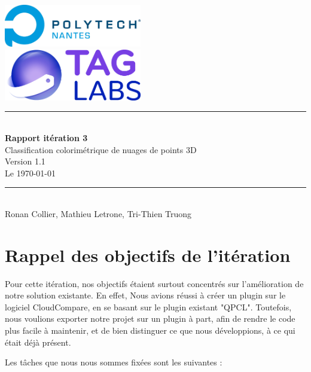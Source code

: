 \documentclass[12pt,titlepage,french]{article}
\begin{document}

\begin{titlepage}
\newcommand{\HRule}{\rule{\linewidth}{0.5mm}}
\center

  \includegraphics[width=0.45\textwidth]{../../ressources/img_logos/logo_polytech.png}\\[1cm]

  \includegraphics[width=0.45\textwidth]{../../ressources/img_logos/logo_taglabs.png}


\HRule \\[0.4cm]
{ \huge \bfseries Rapport itération 3\\[0.15cm] }
Classification colorimétrique de nuages de points 3D\\
Version 1.1\\
Le \today \\
\HRule \\[1.5cm]
Ronan Collier,
Mathieu Letrone,
Tri-Thien Truong
\\[1cm]
\end{titlepage}

\tableofcontents %
\newpage
\listoffigures  %
\newpage

\section{Rappel des objectifs de l'itération}
Pour cette itération, nos objectifs étaient surtout concentrés sur l'amélioration de notre solution existante. En effet, Nous avions réussi à créer un plugin sur le logiciel CloudCompare, en se basant sur le plugin existant "QPCL". Toutefois, nous voulions exporter notre projet sur un plugin à part, afin de rendre le code plus facile à maintenir, et de bien distinguer ce que nous développions, à ce qui était déjà présent.

Les tâches que nous nous sommes fixées sont les suivantes :
\end{document}
